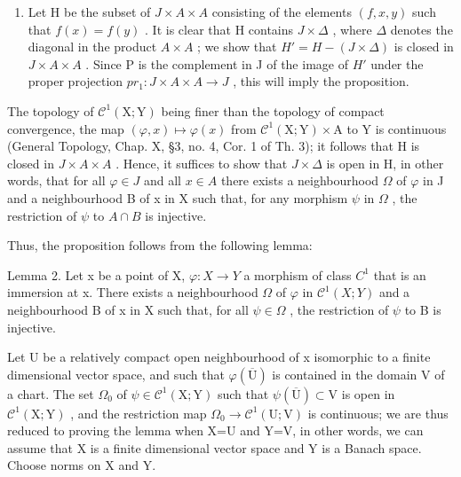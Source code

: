 \begin{enumerate}
\def\labelenumi{\alph{enumi})}
\setcounter{enumi}{1}
\tightlist
\item
  Let H be the subset of \(J \times A \times A\) consisting of the elements \((f, x, y)\) such that \(f(x) = f(y)\) . It is clear that H contains \(J \times \Delta\) , where \(\Delta\) denotes the diagonal in the product \(A \times A\) ; we show that \(H' = H - (J \times \Delta)\) is closed in \(J \times A \times A\) . Since P is the complement in J of the image of \(H'\) under the proper projection \(pr_{1}: J \times A \times A \to J\) , this will imply the proposition.
\end{enumerate}

The topology of \(\mathcal{C}^{1}(\mathrm{X};\mathrm{Y})\) being finer than the topology of compact convergence, the map \((\varphi,x)\mapsto\varphi(x)\) from \(\mathcal{C}^{1}(\mathrm{X};\mathrm{Y})\times\mathrm{A}\) to Y is continuous (General Topology, Chap. X, §3, no. 4, Cor. 1 of Th. 3); it follows that H is closed in \(J\times A\times A\) . Hence, it suffices to show that \(J\times\Delta\) is open in H, in other words, that for all \(\varphi\in J\) and all \(x\in A\) there exists a neighbourhood \(\Omega\) of \(\varphi\) in J and a neighbourhood B of x in X such that, for any morphism \(\psi\) in \(\Omega\) , the restriction of \(\psi\) to \(A\cap B\) is injective.

Thus, the proposition follows from the following lemma:

Lemma 2. Let x be a point of X, \(\varphi: X \to Y\) a morphism of class \(C^{1}\) that is an immersion at x. There exists a neighbourhood \(\Omega\) of \(\varphi\) in \(\mathcal{C}^{1}(X;Y)\) and a neighbourhood B of x in X such that, for all \(\psi \in \Omega\) , the restriction of \(\psi\) to B is injective.

Let U be a relatively compact open neighbourhood of x isomorphic to a finite dimensional vector space, and such that \(\varphi(\overline{\mathrm{U}})\) is contained in the domain V of a chart. The set \(\Omega_{0}\) of \(\psi\in\mathcal{C}^{1}(\mathrm{X};\mathrm{Y})\) such that \(\psi(\overline{\mathrm{U}})\subset\mathrm{V}\) is open in \(\mathcal{C}^{1}(\mathrm{X};\mathrm{Y})\) , and the restriction map \(\Omega_{0}\to\mathcal{C}^{1}(\mathrm{U};\mathrm{V})\) is continuous; we are thus reduced to proving the lemma when X=U and Y=V, in other words, we can assume that X is a finite dimensional vector space and Y is a Banach space. Choose norms on X and Y.

